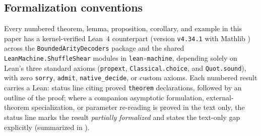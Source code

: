 \subsection{Formalization conventions}\label{sec:conventions}

Every numbered theorem, lemma, proposition, corollary, and example in this paper has a kernel-verified
Lean~4 counterpart (version \texttt{v4.34.1} with Mathlib \cite{Mathlib2026}) across the
\texttt{BoundedArityDecoders} package and the shared \texttt{LeanMachine.ShuffleShear} modules in
\texttt{lean-machine}, depending solely on Lean's three standard axioms (\texttt{propext},
\texttt{Classical.choice}, and \texttt{Quot.sound}), with zero \texttt{sorry}, \texttt{admit},
\texttt{native\_decide}, or custom axioms. Each numbered result carries a \textsf{Lean:} status line
citing proved \texttt{theorem} declarations, followed by an outline of the proof; where a companion
asymptotic formulation, external-theorem specialization, or parameter re-reading is proved in the text
only, the status line marks the result \emph{partially formalized} and states the text-only gap
explicitly (summarized in ).
